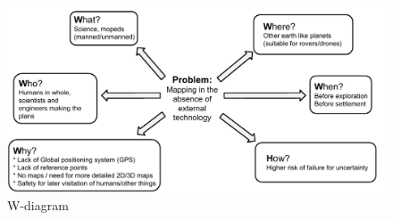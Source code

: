 
\begin{figure}[!h]
	\centering
	\includegraphics[scale=.7]{images/wdiagram1.pdf}
	\caption{W-diagram}
	\label{fig:wdiagram}
\end{figure}